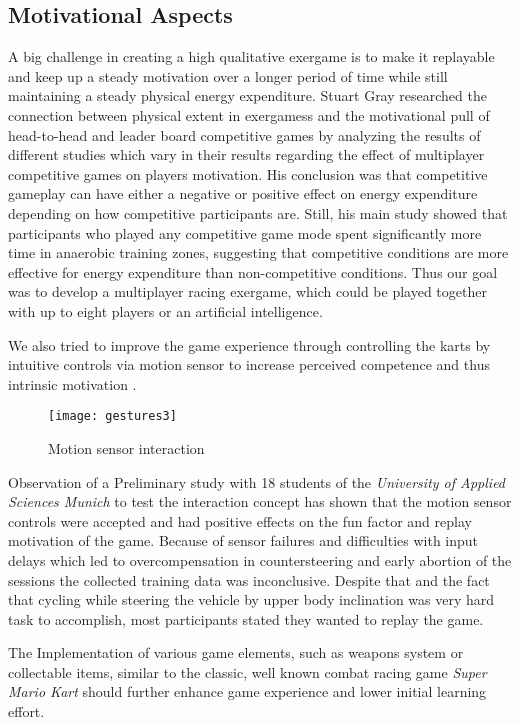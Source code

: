 \begin{multicols}{2}
\section{Motivational Aspects}

A big challenge in creating a high qualitative exergame is to make it replayable and keep up a steady motivation over a longer period of time while still maintaining a steady physical energy expenditure. 
Stuart Gray researched the connection between physical extent in exergamess and the motivational pull of head-to-head and leader board competitive games \cite{Gray2013} by analyzing the results of different studies which vary in their results regarding the effect of multiplayer competitive games on players motivation. His conclusion was that competitive gameplay can have either a negative or positive effect on energy expenditure depending on how competitive participants are. Still, his main study showed that participants who played any competitive game mode spent significantly more time in anaerobic training zones, suggesting that competitive conditions are more effective for energy expenditure than non-competitive conditions. Thus our goal was to develop a multiplayer racing exergame, which could be played together with up to eight players or an artificial intelligence.

We also tried to improve the game experience through controlling the karts by intuitive controls via motion sensor to increase perceived competence and thus intrinsic motivation \cite{Ryan2006SDT}.
\begin{figure}[H]
  \centering
    \texttt{[image: gestures3]}
 \caption{Motion sensor interaction}
\end{figure}
Observation of a Preliminary study with 18 students of the \emph{University of Applied Sciences Munich} to test the interaction concept has shown that the motion sensor controls were accepted and had positive effects on the fun factor and replay motivation of the game. Because of sensor failures and difficulties with input delays which led to overcompensation in countersteering and early abortion of the sessions the collected training data was inconclusive. Despite that and the fact that cycling while steering the vehicle by upper body inclination was very hard task to accomplish, most participants stated they wanted to replay the game.

The Implementation of various game elements, such as weapons system or collectable items, similar to the classic, well known combat racing game \emph{ Super Mario Kart} \cite{NitendoWiiMario} should further enhance game experience and lower initial learning effort. 


\end{multicols}
